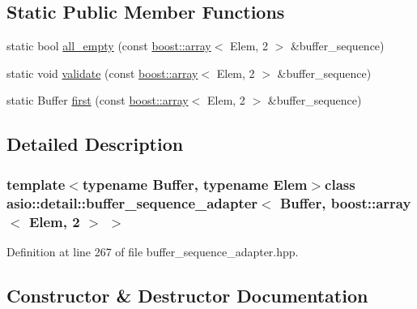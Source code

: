\subsection*{Static Public Member Functions}
\begin{DoxyCompactItemize}
\item 
static bool \hyperlink{classasio_1_1detail_1_1buffer__sequence__adapter_3_01_buffer_00_01boost_1_1array_3_01_elem_00_012_01_4_01_4_aaf696bcad81ff1aebb9c006eb4dc7388}{all\+\_\+empty} (const \hyperlink{classboost_1_1array}{boost\+::array}$<$ Elem, 2 $>$ \&buffer\+\_\+sequence)
\item 
static void \hyperlink{classasio_1_1detail_1_1buffer__sequence__adapter_3_01_buffer_00_01boost_1_1array_3_01_elem_00_012_01_4_01_4_a28cc37c3a045cf16f8dc09ffdbc7ab55}{validate} (const \hyperlink{classboost_1_1array}{boost\+::array}$<$ Elem, 2 $>$ \&buffer\+\_\+sequence)
\item 
static Buffer \hyperlink{classasio_1_1detail_1_1buffer__sequence__adapter_3_01_buffer_00_01boost_1_1array_3_01_elem_00_012_01_4_01_4_abf75dffef4de06633c12adb289d3f974}{first} (const \hyperlink{classboost_1_1array}{boost\+::array}$<$ Elem, 2 $>$ \&buffer\+\_\+sequence)
\end{DoxyCompactItemize}


\subsection{Detailed Description}
\subsubsection*{template$<$typename Buffer, typename Elem$>$class asio\+::detail\+::buffer\+\_\+sequence\+\_\+adapter$<$ Buffer, boost\+::array$<$ Elem, 2 $>$ $>$}



Definition at line 267 of file buffer\+\_\+sequence\+\_\+adapter.\+hpp.



\subsection{Constructor \& Destructor Documentation}
\hypertarget{classasio_1_1detail_1_1buffer__sequence__adapter_3_01_buffer_00_01boost_1_1array_3_01_elem_00_012_01_4_01_4_aa1ffc7826198838ad79f17fd9b7fe580}{}
